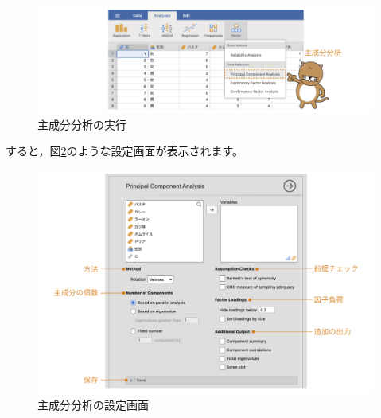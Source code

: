 \documentclass[
  12pt,
  a5jpaper,
  lualatex, ja=standard]{bxjsbook}
\begin{document}
\begin{figure}[!ht]

{\centering \includegraphics[width=1\linewidth]{images/factor/pca-menu} 

}

\caption{主成分分析の実行}\label{fig:factor-pca-menu}
\end{figure}

すると，図\ref{fig:factor-pca-setting}のような設定画面が表示されます。

\begin{figure}[!ht]

{\centering \includegraphics[width=1\linewidth]{images/factor/pca-setting} 

}

\caption{主成分分析の設定画面}\label{fig:factor-pca-setting}
\end{figure}
\end{document}
